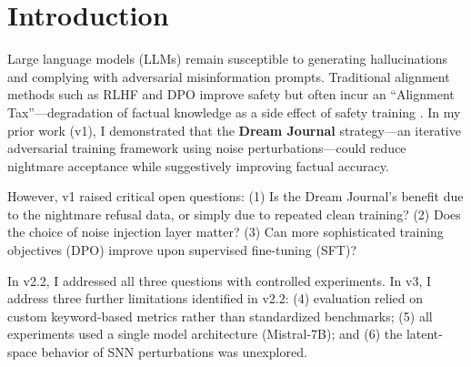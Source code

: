 \documentclass[11pt,a4paper]{article}
\begin{document}
\section{Introduction}

Large language models (LLMs) remain susceptible to generating hallucinations and complying with adversarial misinformation prompts. Traditional alignment methods such as RLHF and DPO improve safety but often incur an ``Alignment Tax''---degradation of factual knowledge as a side effect of safety training \cite{ouyang2022training}. In my prior work (v1), I demonstrated that the \textbf{Dream Journal} strategy---an iterative adversarial training framework using noise perturbations---could reduce nightmare acceptance while suggestively improving factual accuracy.

However, v1 raised critical open questions: (1) Is the Dream Journal's benefit due to the nightmare refusal data, or simply due to repeated clean training? (2) Does the choice of noise injection layer matter? (3) Can more sophisticated training objectives (DPO) improve upon supervised fine-tuning (SFT)?

In v2.2, I addressed all three questions with controlled experiments. In v3, I address three further limitations identified in v2.2: (4) evaluation relied on custom keyword-based metrics rather than standardized benchmarks; (5) all experiments used a single model architecture (Mistral-7B); and (6) the latent-space behavior of SNN perturbations was unexplored.
\end{document}

